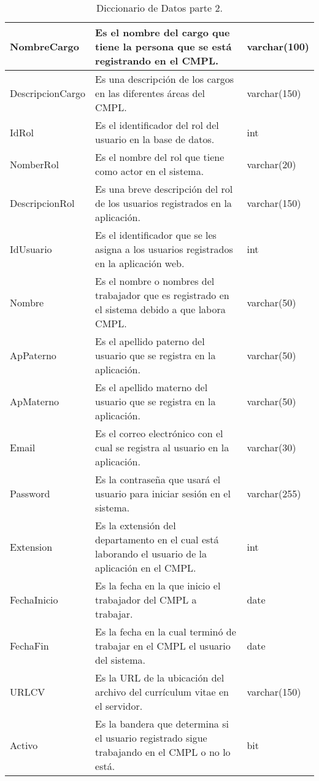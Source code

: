 \begin{table}[htbp!]
\begin{center}
\begin{tabular}{|l | l | l}
			NombreCargo & Es el nombre del cargo que tiene la persona que se está registrando en el CMPL. & varchar(100)\\\hline
			DescripcionCargo & Es una descripción de los cargos en las diferentes áreas del CMPL. & varchar(150)\\\hline
			IdRol & Es el identificador del rol del usuario en la base de datos. & int\\\hline
			NomberRol & Es el nombre del rol que tiene como actor en el sistema. & varchar(20)\\\hline
			DescripcionRol & Es una breve descripción del rol de los usuarios registrados en la aplicación. & varchar(150)\\\hline
			IdUsuario & Es el identificador que se les asigna a los usuarios registrados en la aplicación web. & int\\\hline
			Nombre & Es el nombre o nombres del trabajador que es registrado en el sistema debido a que labora CMPL. & varchar(50)\\\hline
			ApPaterno & Es el apellido paterno del usuario que se registra en la aplicación. & varchar(50)\\\hline
			ApMaterno & Es el apellido materno del usuario que se registra en la aplicación. & varchar(50)\\\hline
			Email & Es el correo electrónico con el cual se registra al usuario en la aplicación. & varchar(30)\\\hline
			Password & Es la contraseña que usará el usuario para iniciar sesión en el sistema. & varchar(255)\\\hline
			Extension & Es la extensión del departamento en el cual está laborando el usuario de la aplicación en el CMPL. & int\\\hline
			FechaInicio & Es la fecha en la que inicio el trabajador del CMPL a trabajar. & date\\\hline
			FechaFin & Es la fecha en la cual terminó de trabajar en el CMPL el usuario del sistema. & date \\\hline
			URLCV & Es la URL de la ubicación del archivo del currículum vitae en el servidor. & varchar(150)\\\hline
			Activo & Es la bandera que determina si el usuario registrado sigue trabajando en el CMPL o no lo está. & bit\\\hline
		\end{tabular}
		\caption{Diccionario de Datos parte 2.}
		\label{Diccionario}
	\end{center}
\end{table}
